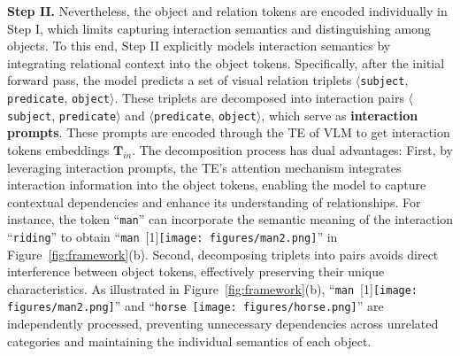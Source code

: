\textbf{Step II.}  
Nevertheless, the object and relation tokens are encoded individually in Step I, which limits capturing interaction semantics and distinguishing among objects. To this end, Step II explicitly models interaction semantics by integrating relational context into the object tokens. 
Specifically, after the initial forward pass, the model predicts a set of visual relation triplets $\langle$\texttt{subject}, \texttt{predicate}, \texttt{object}$\rangle$. These triplets are decomposed into interaction pairs $\langle$\texttt{subject}, \texttt{predicate}$\rangle$ and $\langle$\texttt{predicate}, \texttt{object}$\rangle$, which serve as \textbf{interaction prompts}. These prompts are encoded through the TE of VLM to get interaction tokens embeddings $\mathbf{T}_{in}$. The decomposition process has dual advantages: First, by leveraging interaction prompts, the TE's attention mechanism integrates interaction information into the object tokens, enabling the model to capture contextual dependencies and enhance its understanding of relationships. For instance, the token ``\texttt{man}'' can incorporate the semantic meaning of the interaction ``\texttt{riding}'' to obtain ``\texttt{man}~\scalebox{-1}[1]{\texttt{[image: figures/man2.png]}}'' in Figure~\ref{fig:framework}(b). Second, decomposing triplets into pairs avoids direct interference between object tokens, effectively preserving their unique characteristics. As illustrated in Figure~\ref{fig:framework}(b), ``\texttt{man}~\scalebox{-1}[1]{\texttt{[image: figures/man2.png]}}'' and ``\texttt{horse}~{\texttt{[image: figures/horse.png]}}'' are independently processed, preventing unnecessary dependencies across unrelated categories and maintaining the individual semantics of each object.

